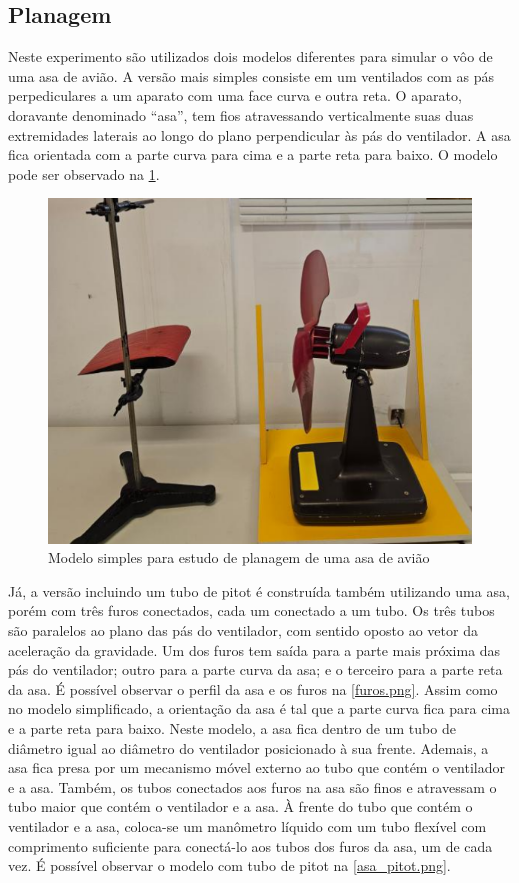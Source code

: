 \subsection{Planagem}
    Neste experimento são utilizados dois modelos diferentes para simular o vôo de uma asa de avião. A versão mais simples consiste em um ventilados com as pás perpediculares a um aparato com uma face curva e outra reta. O aparato, doravante denominado ``asa'', tem fios atravessando verticalmente suas duas extremidades laterais ao longo do plano perpendicular às pás do ventilador. A asa fica orientada com a parte curva para cima e a parte reta para baixo. O modelo pode ser observado na \cref{asa_simples.png}.

    \begin{figure}[H]
        \centering
        \includegraphics[width=0.35\linewidth]{fig/asa_simples.png}
        \caption{Modelo simples para estudo de planagem de uma asa de avião}
        \label{asa_simples.png}
    \end{figure}
    
    Já, a versão incluindo um tubo de pitot é construída também utilizando uma asa, porém com três furos conectados, cada um conectado a um tubo. Os três tubos são paralelos ao plano das pás do ventilador, com sentido oposto ao vetor da aceleração da gravidade. Um dos furos tem saída para a parte mais próxima das pás do ventilador; outro para a parte curva da asa; e o terceiro para a parte reta da asa. É possível observar o perfil da asa e os furos na \cref{furos.png}. Assim como no modelo simplificado, a orientação da asa é tal que a parte curva fica para cima e a parte reta para baixo. Neste modelo, a asa fica dentro de um tubo de diâmetro igual ao diâmetro do ventilador posicionado à sua frente. Ademais, a asa fica presa por um mecanismo móvel externo ao tubo que contém o ventilador e a asa. Também, os tubos conectados aos furos na asa são finos e atravessam o tubo maior que contém o ventilador e a asa. À frente do tubo que contém o ventilador e a asa, coloca-se um manômetro líquido com um tubo flexível com comprimento suficiente para conectá-lo aos tubos dos furos da asa, um de cada vez. É possível observar o modelo com tubo de pitot na \cref{asa_pitot.png}.

